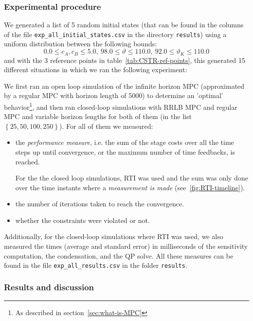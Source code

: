 \documentclass[12pt]{article}
\begin{document}
\subsubsection{Experimental procedure}

We generated a list of 5 random initial states (that can be found in the columns of the file \verb|exp_all_initial_states.csv| in the directory \verb|results|) using a uniform distribution between the following bounds:
$$0.0\leq c_A,c_B\leq 5.0,~98.0\leq\vartheta\leq 110.0,~92.0\leq \vartheta_K\leq 110.0$$
and with the 3 reference points in table~\ref{tab:CSTR-ref-points}, this generated 15 different situations in which we ran the following experiment:

We first ran an open loop simulation of the infinite horizon MPC (approximated by a regular MPC with horizon length of 5000) to determine an 'optimal' behavior\footnote{As described in section~\ref{sec:what-is-MPC}}, and then ran closed-loop simulations with RRLB MPC and regular MPC and variable horizon lengths for both of them (in the list $\left\{ 25, 50, 100, 250 \right\}$).
For all of them we measured:
\begin{itemize}[label=\textbullet]
	\item the \textit{performance measure}, i.e. the sum of the stage costs over all the time steps up until convergence, or the maximum number of time feedbacks, is reached.

	For the the closed loop simulations, RTI was used and the sum was only done over the time instants where a \textit{measurement is made} (see~\ref{fig:RTI-timeline}).

	\item the number of iterations taken to reach the convergence.

	\item whether the constraints were violated or not.
\end{itemize}

\noindent Additionally, for the closed-loop simulations where RTI was used, we also measured the times (average and standard error) in milliseconds of the sensitivity computation, the condensation, and the QP solve.
All these measures can be found in the file \verb|exp_all_results.csv| in the folder \verb|results|.

\subsubsection{Results and discussion}\label{sec:results-discussion}
\end{document}
